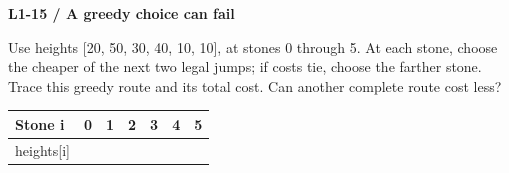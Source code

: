 \documentclass[11pt,a4paper]{article}
\begin{document}
\par\noindent\begin{minipage}{\linewidth}
\textbf{L1-15 / A greedy choice can fail}\par\smallskip Use heights [20, 50, 30, 40, 10, 10], at stones 0 through 5. At each stone, choose the cheaper of the next two legal jumps; if costs tie, choose the farther stone. Trace this greedy route and its total cost. Can another complete route cost less?\par
\par\smallskip \begingroup\small\setlength{\tabcolsep}{4pt}\renewcommand{\arraystretch}{1.35}\begin{tabularx}{\linewidth}{>{\raggedright\arraybackslash}l>{\raggedright\arraybackslash}X>{\raggedright\arraybackslash}X>{\raggedright\arraybackslash}X>{\raggedright\arraybackslash}X>{\raggedright\arraybackslash}X>{\raggedright\arraybackslash}X}\toprule\textbf{Stone i} & \textbf{0} & \textbf{1} & \textbf{2} & \textbf{3} & \textbf{4} & \textbf{5}\\\midrule
heights[i] & 20 & 50 & 30 & 40 & 10 & 10\\
\bottomrule\end{tabularx}\endgroup\par\smallskip 
\end{minipage}\par\vspace{2mm}
\end{document}
